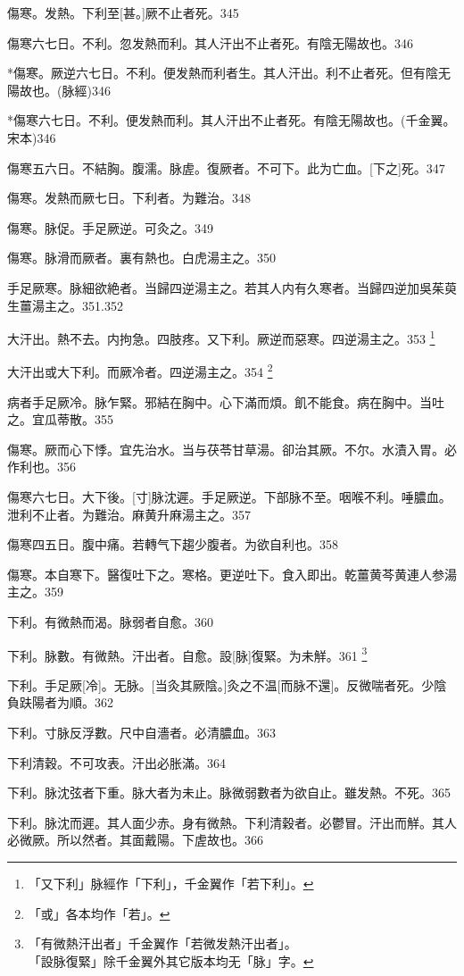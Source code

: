 \documentclass[12pt,twoside,UTF8,b5paper]{ctexbook}
\begin{document}
傷寒。发熱。下利至[甚。]厥不止者死。345

傷寒六七日。不利。忽发熱而利。其人汗出不止者死。有陰无陽故也。346

*傷寒。厥逆六七日。不利。便发熱而利者生。其人汗出。利不止者死。但有陰无陽故也。(脉經)346

*傷寒六七日。不利。便发熱而利。其人汗出不止者死。有陰无陽故也。(千金翼。宋本)346

傷寒五六日。不結胸。腹濡。脉虗。復厥者。不可下。此为亡血。[下之]死。347

傷寒。发熱而厥七日。下利者。为難治。348

傷寒。脉促。手足厥逆。可灸之。349

傷寒。脉滑而厥者。裏有熱也。白虎湯主之。350

手足厥寒。脉細欲絶者。当歸四逆湯主之。若其人内有久寒者。当歸四逆加吳茱萸生薑湯主之。351.352

大汗出。熱不去。内拘急。四肢疼。又下利。厥逆而惡寒。四逆湯主之。353
	\footnote{「又下利」脉經作「下利」，千金翼作「若下利」。}

大汗出或大下利。而厥冷者。四逆湯主之。354
	\footnote{「或」各本均作「若」。}

病者手足厥冷。脉乍緊。邪結在胸中。心下滿而煩。飢不能食。病在胸中。当吐之。宜瓜蒂散。355

傷寒。厥而心下悸。宜先治水。当与茯苓甘草湯。卻治其厥。不尔。水漬入胃。必作利也。356

傷寒六七日。大下後。[寸]脉沈遲。手足厥逆。下部脉不至。咽喉不利。唾膿血。泄利不止者。为難治。麻黄升麻湯主之。357

傷寒四五日。腹中痛。若轉气下趨少腹者。为欲自利也。358

傷寒。本自寒下。醫復吐下之。寒格。更逆吐下。食入即出。乾薑黄芩黄連人参湯主之。359

下利。有微熱而渴。脉弱者自愈。360

下利。脉數。有微熱。汗出者。自愈。設[脉]復緊。为未觧。361
	\footnote{「有微熱汗出者」千金翼作「若微发熱汗出者」。\\「設脉復緊」除千金翼外其它版本均无「脉」字。}

下利。手足厥[冷]。无脉。[当灸其厥陰。]灸之不温[而脉不還]。反微喘者死。少陰負趺陽者为順。362

下利。寸脉反浮數。尺中自濇者。必清膿血。363

下利清穀。不可攻表。汗出必胀滿。364

下利。脉沈弦者下重。脉大者为未止。脉微弱數者为欲自止。雖发熱。不死。365

下利。脉沈而遲。其人面少赤。身有微熱。下利清穀者。必鬱冒。汗出而觧。其人必微厥。所以然者。其面戴陽。下虗故也。366
\end{document}
